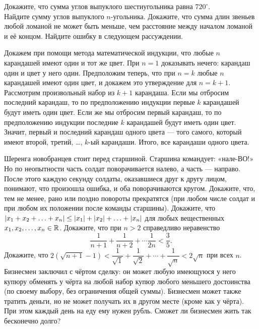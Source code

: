 \documentclass[a4paper,12pt]{article}
\begin{document}
    \problem \sub Докажите, что сумма углов выпуклого шестиугольника равна $720^\circ$. \\
    \sub Найдите сумму углов выпуклого $n$-угольника.
    \problem Докажите, что сумма длин звеньев любой ломаной не может быть меньше, чем расстояние между началом ломаной и её концом.
    \problem Найдите ошибку в следующем рассуждении.
    \begin{solution}
        Докажем при помощи метода математической индукции, что любые $n$ карандашей имеют один и тот же цвет. При $n = 1$ доказывать нечего: карандаш один и цвет у него один. Предположим теперь, что при $n = k$ любые $n$ карандашей имеют один цвет, и докажем это утверждение для $n = k + 1$. Рассмотрим произвольный набор из $k + 1$ карандаша. Если мы отбросим последний карандаш, то по предположению индукции первые $k$ карандашей будут иметь один цвет. Если же мы отбросим первый карандаш, то по предположению индукции последние $k$ карандашей будут иметь один цвет. Значит, первый и последний карандаш одного цвета --- того самого, который имеют второй, третий, \ldots, $k$-ый карандаши. Итого, все карандаши одного цвета.
    \end{solution}
    \problem Шеренга новобранцев стоит перед старшиной. Старшина командует: \linebreak\mbox{«нале-ВО!»} Но по неопытности часть солдат поворачивается налево, а часть --- направо. После этого каждую секунду солдаты, оказавшиеся друг к другу лицом, понимают, что произошла ошибка, и оба поворачиваются кругом. Докажите, что, тем не менее, рано или поздно повороты прекратятся (при любом числе солдат и при любом их положении после команды старшины).
    \problem Докажите, что $\lvert x_1 + x_2 + \ldots + x_n\rvert \leq \lvert x_1\rvert + \lvert x_2\rvert + \ldots + \lvert x_n\rvert$ для любых вещественных $x_1, x_2, \ldots, x_n \in \mathbb{R}$. 
    \problem Докажите, что при $n > 2$ справедливо неравенство 
    \begin{equation*}
        \dfrac{1}{n + 1} + \dfrac{1}{n + 2} + \cdots \dfrac{1}{2n} < \dfrac{3}{5}.
    \end{equation*}
    \problem Докажите, что $2(\sqrt{n + 1} - 1) < \dfrac{1}{\sqrt{1}} + \dfrac{1}{\sqrt{2}} + \cdots + \dfrac{1}{\sqrt{n}} < 2 \sqrt{n}$ при всех $n$.
    \problem Бизнесмен заключил с чёртом сделку: он может любую имеющуюся у него купюру обменять у чёрта на любой набор купюр любого меньшего достоинства (по своему выбору, без ограничения общей суммы). Бизнесмен может также тратить деньги, но не может получать их в другом месте (кроме как у чёрта). При этом каждый день на еду ему нужен рубль. Сможет ли бизнесмен жить так бесконечно долго?
\end{document}
